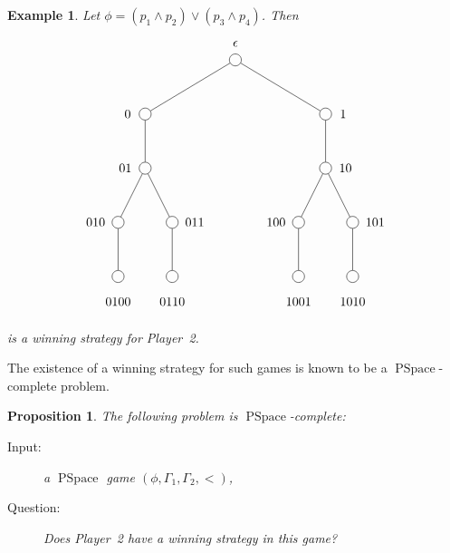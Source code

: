 \documentclass[openany]{scrbook}
\theoremstyle{break}
\newtheorem{Proposition}[Theorem]{Proposition}
\newtheorem{NumberedExample}[Theorem]{Example}
\theoremstyle{nonumberbreak}
\theoremstyle{nonumberplain}
\theoremstyle{nonumberbreak}
\newcommand{\PSpace}{\operatorname{PSpace}}
\begin{document}
\begin{NumberedExample}
  \label{6.5}
  Let $\phi = (p_1 \wedge p_2) \vee (p_3 \wedge p_4)$.
  Then
  \begin{equation*}
    \tikzstyle{every node}=[circle,draw=black,thin]
    \tikzstyle{level 1}=[sibling distance=50mm]
    \tikzstyle{level 2}=[sibling distance=25mm]
    \tikzstyle{level 3}=[sibling distance=15mm]
    \begin{tikzpicture}[baseline]
      \node [label=above:$\epsilon$] {}
      child { node [label=left:$0$] {}
        child { node [label=left:$01$] {}
          child { node [label=left:$010$] {}
            child { node [label=below:$0100$] {}}}
          child { node [label=right:$011$] {}
            child { node [label=below:$0110$] {}}}}}
      child { node [label=right:$1$] {}
        child { node [label=right:$10$] {}
          child { node [label=left:$100$] {}
            child { node [label=below:$1001$] {}}}
          child { node [label=right:$101$] {}
            child { node [label=below:$1010$] {}}}}};
    \end{tikzpicture}
  \end{equation*}
  is a winning strategy for Player~2.
\end{NumberedExample}

The existence of a winning strategy for such games is known to be a
$\PSpace$-complete problem.

\begin{Proposition}
  \label{6.6}
  The following problem is $\PSpace$-complete:
  \begin{description}
  \item[Input:] a $\PSpace$ game $(\phi, \Gamma_1, \Gamma_2, <)$,
  \item[Question:] Does Player~2 have a winning strategy in this game?
  \end{description}
\end{Proposition}
\end{document}
